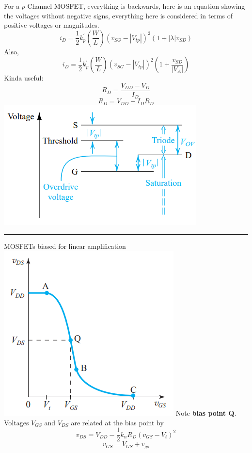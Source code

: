 \documentclass[a4paper]{article}
\begin{document}
\begin{multicols}{3}
For a $p$-Channel MOSFET, everything is backwards, here is an
equation showing the voltages without negative signs, everything
here is considered in terms of positive voltages or magnitudes.
$$i_D=\frac{1}{2}k_p^{'}\left(\frac{W}{L}\right)(v_{SG}-|V_{tp}|)^2(1+|\lambda|v_{SD})$$
Also,
$$i_D=\frac{1}{2}k_p^{'}\left(\frac{W}{L}\right)(v_{SG}-|V_{tp}|)^2\left(1+\frac{v_{SD}}{|V_A|}\right)$$
Kinda useful:
$$R_D=\frac{V_{DD}-V_D}{I_D}$$
$$R_D=V_{DD}-I_D R_D$$
\includegraphics[width=\linewidth]{imgs/pmos_operation.png}

\hrule
\vspace{1mm}
MOSFETs biased for linear amplification
\includegraphics[width=\linewidth]{imgs/bias_point_q.png}
Note \textbf{bias point Q}.
Voltages $V_{GS}$ and $V_{DS}$ are related at the bias point
by 
$$v_{DS}=V_{DD}-\frac{1}{2}k_n R_D (v_{GS}-V_t)^2$$
$$v_{GS}=V_{GS}+v_{gs}$$


\end{multicols}
\end{document}
